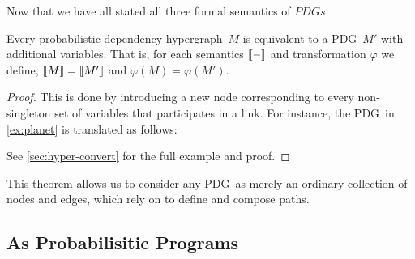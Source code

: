 \documentclass{article}
\newcommand\Set{\textbf{Set}}
\newcommand{\modelnamehyper}{probabilistic dependency hypergraph}
\newcommand{\MN}{PDG}
\newcommand{\MNs}{\MN s}
\begin{document}
	
	
	Now that we have all stated all three formal semantics of $\MNs$

	
	

	\begin{theorem}[restate=thmhyperequiv]\label{thm:hyperequiv}
		Every \modelnamehyper\ $M$ is equivalent to a \MN\ $M'$ with additional variables. That is, for each semantics $\llbracket-\rrbracket$ and transformation $\varphi$ we define, $\llbracket M\rrbracket = \llbracket M'\rrbracket$ and $\varphi(M) = \varphi(M')$.
	\end{theorem}
	\begin{proof}
		This is done by introducing a new node corresponding to every non-singleton set of variables that participates in a link. For instance, the \MN\ in \cref{ex:planet} is translated as follows:
		\begin{center}
		\end{center}
		See \cref{sec:hyper-convert} for the full example and proof.
	\end{proof}
	
	This theorem allows us to consider any \MN\ as merely an ordinary collection of nodes and edges, which rely on to define and compose paths.
	

	
	
	\subsection{As Probabilisitic Programs}\label{sec:prog-semantics}
	
\end{document}
